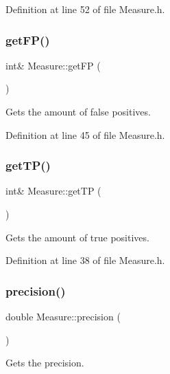Definition at line 52 of file Measure.\+h.

\mbox{\label{class_measure_a68c038fe576017b5d3ce00895dc0aeb5}} 
\subsubsection{\texorpdfstring{get\+F\+P()}{getFP()}}
{\footnotesize\ttfamily int\& Measure\+::get\+FP (\begin{DoxyParamCaption}{ }\end{DoxyParamCaption})\hspace{0.3cm}{\ttfamily [inline]}}

Gets the amount of false positives. 

Definition at line 45 of file Measure.\+h.

\mbox{\label{class_measure_a28c4d8877916c477d2e3003d3f467ca2}} 
\subsubsection{\texorpdfstring{get\+T\+P()}{getTP()}}
{\footnotesize\ttfamily int\& Measure\+::get\+TP (\begin{DoxyParamCaption}{ }\end{DoxyParamCaption})\hspace{0.3cm}{\ttfamily [inline]}}

Gets the amount of true positives. 

Definition at line 38 of file Measure.\+h.

\mbox{\label{class_measure_a2cac1a29c5ae012b810499be8d301753}} 
\subsubsection{\texorpdfstring{precision()}{precision()}}
{\footnotesize\ttfamily double Measure\+::precision (\begin{DoxyParamCaption}{ }\end{DoxyParamCaption})\hspace{0.3cm}{\ttfamily [inline]}}

Gets the precision.

